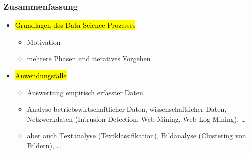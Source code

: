 
\begin{frame}
\frametitle{Zusammenfassung}

\begin{itemize}
\item \hl{Grundlagen des Data-Science-Prozesses}
\begin{itemize}
\item Motivation
\item mehrere Phasen und iteratives Vorgehen
\end{itemize}
\item \hl{Anwendungsfälle}
\begin{itemize}
\item Auswertung empirisch erfasster Daten
\item Analyse betriebswirtschaftlicher Daten, wissenschaftlicher
  Daten, Netzwerkdaten (Intrusion Detection, Web Mining, Web Log
  Mining), \dots
\item aber auch Textanalyse (Textklassifikation), Bildanalyse
  (Clustering von Bildern), \dots
\end{itemize}
\end{itemize}

\end{frame}


